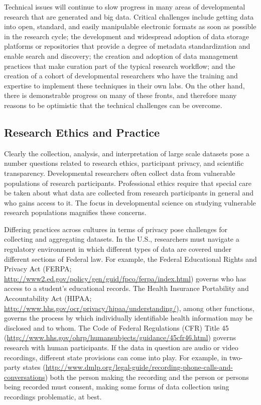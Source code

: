 \documentclass[letterpaper,man,apacite]{apa6}
\begin{document}
Technical issues will continue to slow progress in many areas of developmental research that are generated and big data.
Critical challenges include getting data into open, standard, and easily manipulable electronic formats as soon as possible in the research cycle; the development and widespread adoption of data storage platforms or repositories that provide a degree of metadata standardization and enable search and discovery; the creation and adoption of data management practices that make curation part of the typical research workflow; and the creation of a cohort of developmental researchers who have the training and expertise to implement these techniques in their own labs.
On the other hand, there is demonstrable progress on many of these fronts, and therefore many reasons to be optimistic that the technical challenges can be overcome.

\subsection{Research Ethics and Practice}

Clearly the collection, analysis, and interpretation of large scale datasets pose a number questions related to research ethics, participant privacy, and scientific transparency.
Developmental researchers often collect data from vulnerable populations of research participants.
Professional ethics require that special care be taken about what data are collected from research participants in general and who gains access to it.
The focus in developmental science on studying vulnerable research populations magnifies these concerns.

Differing practices across cultures in terms of privacy pose challenges for collecting and aggregating datasets.
In the U.S., researchers must navigate a regulatory environment in which different types of data are covered under different sections of Federal law.
For example, the Federal Educational Rights and Privacy Act (FERPA; \url{http://www2.ed.gov/policy/gen/guid/fpco/ferpa/index.html}) governs who has access to a student's educational records.
The Health Insurance Portability and Accountability Act (HIPAA; \url{http://www.hhs.gov/ocr/privacy/hipaa/understanding/}), among other functions, governs the process by which individually identifiable health information may be disclosed and to whom.
The Code of Federal Regulations (CFR) Title 45 (\url{http://www.hhs.gov/ohrp/humansubjects/guidance/45cfr46.html}) governs research with human participants.
If the data in question are audio or video recordings, different state provisions can come into play.
For example, in two-party states (\url{http://www.dmlp.org/legal-guide/recording-phone-calls-and-conversations}) both the person making the recording and the person or persons being recorded must consent, making some forms of data collection using recordings problematic, at best.
\end{document}
